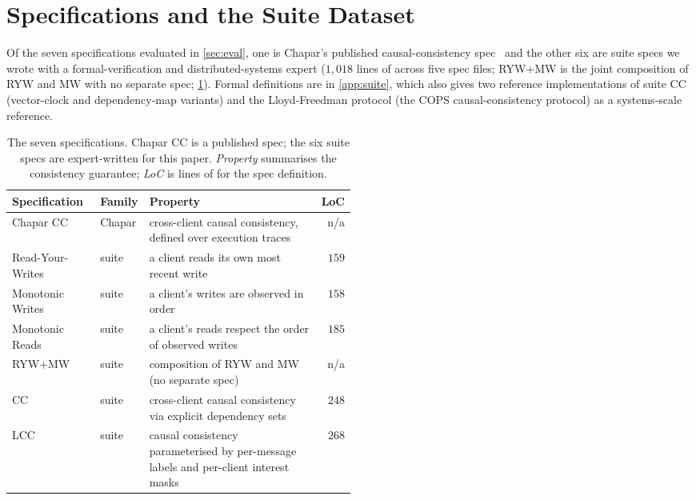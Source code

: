 \section{Specifications and the \sys{} Suite Dataset}
\label{app:consistency-specs}

Of the seven specifications evaluated in \cref{sec:eval}, one is Chapar's published causal-consistency spec~\cite{chapar} and the other six are \sys{} suite specs we wrote with a formal-verification and distributed-systems expert ($1{,}018$ lines of \coq{} across five spec files; RYW+MW is the joint composition of RYW and MW with no separate spec; \cref{tab:eval-specs-summary}). Formal definitions are in \cref{app:suite}, which also gives two reference implementations of \sys{} suite CC (vector-clock and dependency-map variants) and the Lloyd-Freedman protocol (the COPS causal-consistency protocol) as a systems-scale reference.

\begin{table}[h]
\centering
\footnotesize
\setlength{\tabcolsep}{6pt}
\renewcommand{\arraystretch}{1.05}
\caption{The seven specifications. Chapar CC is a published spec; the six \sys{} suite specs are expert-written for this paper. \emph{Property} summarises the consistency guarantee; \emph{LoC} is lines of \coq{} for the spec definition.}
\label{tab:eval-specs-summary}
\begin{tabular}{@{}l l p{0.50\linewidth} r@{}}
\toprule
Specification    & Family       & Property                                                                              & LoC \\
\midrule
Chapar CC        & Chapar       & cross-client causal consistency, defined over execution traces                        & n/a \\
\midrule
Read-Your-Writes & \sys{} suite & a client reads its own most recent write                                              & $159$ \\
Monotonic Writes & \sys{} suite & a client's writes are observed in order                                               & $158$ \\
Monotonic Reads  & \sys{} suite & a client's reads respect the order of observed writes                                 & $185$ \\
RYW+MW           & \sys{} suite & composition of RYW and MW (no separate spec)                                          & n/a \\
CC  & \sys{} suite & cross-client causal consistency via explicit dependency sets                          & $248$ \\
LCC              & \sys{} suite & causal consistency parameterised by per-message labels and per-client interest masks  & $268$ \\
\bottomrule
\end{tabular}
\end{table}

